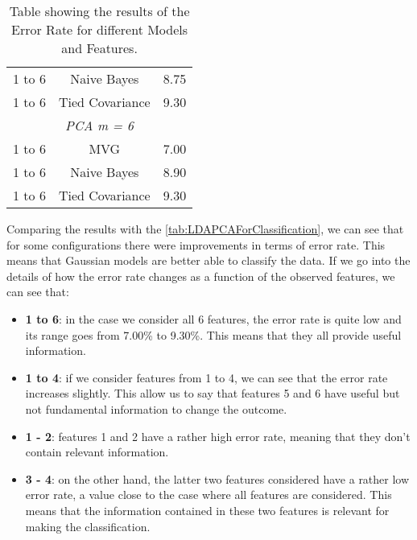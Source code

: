 \begin{table}[h]
\begin{tabular}{c c c}
        1 to 6            & Naive Bayes     & 8.75                     \\
        1 to 6            & Tied Covariance & 9.30                     \\
        \midrule
        \multicolumn{3}{c}{\textit{PCA m = 6}} \\
        \midrule
        1 to 6            & MVG             & 7.00                     \\
        1 to 6            & Naive Bayes     & 8.90                     \\
        1 to 6            & Tied Covariance & 9.30                     \\
        \bottomrule
    \end{tabular}
    \captionsetup{justification=justified,singlelinecheck=false,format=hang}
    \caption{Table showing the results of the Error Rate for different Models and Features.}
    \label{tab:resultGaussianClassificationModels}
\end{table}

Comparing the results with the \autoref{tab:LDAPCAForClassification}, we can see that for some configurations
there were improvements in terms of error rate.
This means that Gaussian models are better able to classify the data.
If we go into the details of how the error rate changes as a function of the observed features,
we can see that:
\begin{itemize}
    \item \textbf{1 to 6}: in the case we consider all 6 features, the error rate is quite low and its range
    goes from 7.00\% to 9.30\%. This means that they all provide useful information.
    \item \textbf{1 to 4}: if we consider features from 1 to 4, we can see that the error rate increases slightly.
    This allow us to say that features 5 and 6 have useful but not fundamental information to change the outcome.
    \item \textbf{1 - 2}: features 1 and 2 have a rather high error rate, meaning that they don't contain
    relevant information.
    \item \textbf{3 - 4}: on the other hand, the latter two features considered have a rather low error rate, a value
    close to the case where all features are considered. This means that the information contained in these two
    features is relevant for making the classification.
\end{itemize}


